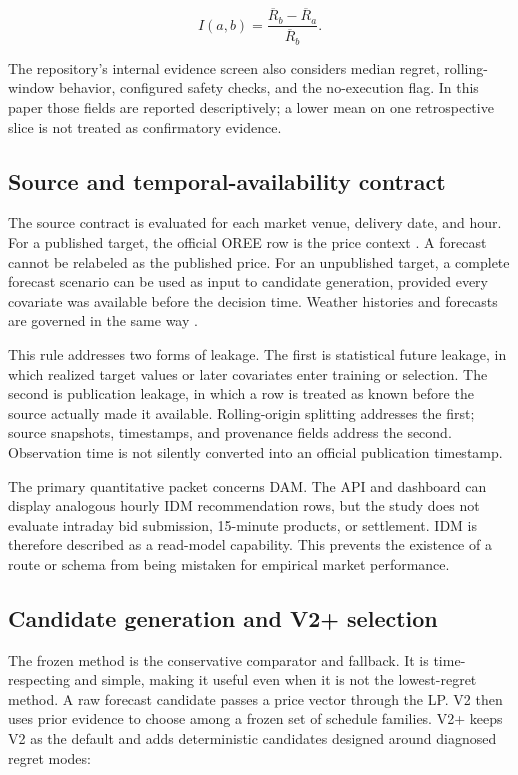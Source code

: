 \begin{equation}
I(a,b)=\frac{\overline{R}_b-\overline{R}_a}{\overline{R}_b}.
\end{equation}

The repository's internal evidence screen also considers median regret, rolling-window behavior, configured safety checks, and the no-execution flag. In this paper those fields are reported descriptively; a lower mean on one retrospective slice is not treated as confirmatory evidence.

\subsection{Source and temporal-availability contract}

The source contract is evaluated for each market venue, delivery date, and hour. For a published target, the official OREE row is the price context \cite{oree2026dam}. A forecast cannot be relabeled as the published price. For an unpublished target, a complete forecast scenario can be used as input to candidate generation, provided every covariate was available before the decision time. Weather histories and forecasts are governed in the same way \cite{openmeteo2026archive}.

This rule addresses two forms of leakage. The first is statistical future leakage, in which realized target values or later covariates enter training or selection. The second is publication leakage, in which a row is treated as known before the source actually made it available. Rolling-origin splitting addresses the first; source snapshots, timestamps, and provenance fields address the second. Observation time is not silently converted into an official publication timestamp.

The primary quantitative packet concerns DAM. The API and dashboard can display analogous hourly IDM recommendation rows, but the study does not evaluate intraday bid submission, 15-minute products, or settlement. IDM is therefore described as a read-model capability. This prevents the existence of a route or schema from being mistaken for empirical market performance.

\subsection{Candidate generation and V2+ selection}

The frozen  method is the conservative comparator and fallback. It is time-respecting and simple, making it useful even when it is not the lowest-regret method. A raw forecast candidate passes a price vector through the LP. V2 then uses prior evidence to choose among a frozen set of schedule families. V2+ keeps V2 as the default and adds deterministic candidates designed around diagnosed regret modes:

